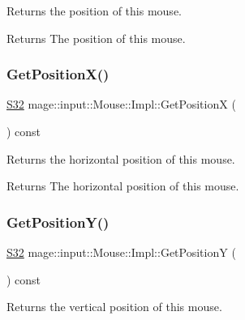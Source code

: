 Returns the position of this mouse.

\begin{DoxyReturn}{Returns}
The position of this mouse. 
\end{DoxyReturn}
\hypertarget{classmage_1_1input_1_1_mouse_1_1_impl_a3446d3bd42aa376e1c3d877cf24a232b}{}\label{classmage_1_1input_1_1_mouse_1_1_impl_a3446d3bd42aa376e1c3d877cf24a232b} 
\subsubsection{\texorpdfstring{Get\+Position\+X()}{GetPositionX()}}
{\footnotesize\ttfamily \hyperlink{namespacemage_a642e05c5c83642b6946703615cdbf2da}{S32} mage\+::input\+::\+Mouse\+::\+Impl\+::\+Get\+PositionX (\begin{DoxyParamCaption}{ }\end{DoxyParamCaption}) const\hspace{0.3cm}{\ttfamily [noexcept]}}

Returns the horizontal position of this mouse.

\begin{DoxyReturn}{Returns}
The horizontal position of this mouse. 
\end{DoxyReturn}
\hypertarget{classmage_1_1input_1_1_mouse_1_1_impl_a5c03e19ff1a384aa6fd9ae5d7c603c9a}{}\label{classmage_1_1input_1_1_mouse_1_1_impl_a5c03e19ff1a384aa6fd9ae5d7c603c9a} 
\subsubsection{\texorpdfstring{Get\+Position\+Y()}{GetPositionY()}}
{\footnotesize\ttfamily \hyperlink{namespacemage_a642e05c5c83642b6946703615cdbf2da}{S32} mage\+::input\+::\+Mouse\+::\+Impl\+::\+Get\+PositionY (\begin{DoxyParamCaption}{ }\end{DoxyParamCaption}) const\hspace{0.3cm}{\ttfamily [noexcept]}}

Returns the vertical position of this mouse.

